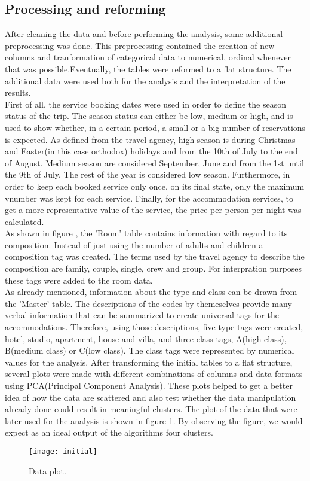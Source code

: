 \subsection{Processing and reforming}
After cleaning the data and before performing the analysis, some additional preprocessing was done. This preprocessing contained the creation of new columns and tranformation of categorical data to numerical, ordinal whenever that was possible.Eventually, the tables were reformed to a flat structure. The additional data were used both for the analysis and the interpretation of the results. \\
First of all, the service booking dates were used in order to define the season status of the trip. The season status can either be low, medium or high, and is used to show whether, in a certain period, a small or a big number of reservations is expected. As defined from the travel agency, high season is during Christmas and Easter(in this case orthodox) holidays and from the 10th of July to the end of August. Medium season are considered September, June and from the 1st until the 9th of July. The rest of the year is considered low season. Furthermore, in order to keep each booked service only once, on its final state, only the maximum vnumber was kept for each service. Finally, for the accommodation services, to get a more representative value of the service, the price per person per night was calculated. \\
As shown in figure , the 'Room' table contains information with regard to its composition. Instead of just using the number of adults and children a composition tag was created. The terms used by the travel agency to describe the composition are family, couple, single, crew and group. For interpration purposes these tags were added to the room data. \\
As already mentioned, information about the type and class can be drawn from the 'Master' table. The descriptions of the codes by themeselves provide many verbal information that can be summarized to create universal tags for the accommodations. Therefore, using those descriptions, five type tags were created, hotel, studio, apartment, house and villa, and three class tags, A(high class), B(medium class) or C(low class). The class tags were represented by numerical values for the analysis.
After transforming the initial tables to a flat structure, several plots were made with different combinations of columns and data formats using PCA(Principal Component Analysis). These plots helped to get a better idea of how the data are scattered and also test whether the data manipulation already done could result in meaningful clusters. The plot of the data that were later used for the analysis is shown in figure \ref{fig:PCA}. By observing the figure, we would expect as an ideal output of the algorithms four clusters. \\
\begin{figure}[ht]
\centering
\texttt{[image: initial]}
\caption{Data plot.}
\label{fig:PCA}
\end{figure}

